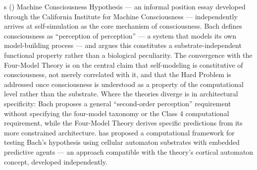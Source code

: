 \documentclass[12pt]{article}
\begin{document}
\citeauthor{Bach2026}\textquotesingle s (\citeyear{Bach2026}) Machine Consciousness Hypothesis --- an informal position essay developed through the California Institute for Machine Consciousness --- independently arrives at self-simulation as the core mechanism of consciousness. Bach defines consciousness as ``perception of perception'' --- a system that models its own model-building process --- and argues this constitutes a substrate-independent functional property rather than a biological peculiarity. The convergence with the Four-Model Theory is on the central claim that self-modeling is constitutive of consciousness, not merely correlated with it, and that the Hard Problem is addressed once consciousness is understood as a property of the computational level rather than the substrate. Where the theories diverge is in architectural specificity: Bach proposes a general ``second-order perception'' requirement without specifying the four-model taxonomy or the Class 4 computational requirement, while the Four-Model Theory derives specific predictions from its more constrained architecture. \citet{Fitz2025} has proposed a computational framework for testing Bach's hypothesis using cellular automaton substrates with embedded predictive agents --- an approach compatible with the theory's cortical automaton concept, developed independently.
\end{document}
